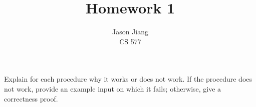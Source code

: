 \documentclass[12pt]{article}
\newenvironment{question}[2][Question]{\begin{trivlist}
\item[\hskip \labelsep {\bfseries #1}\hskip \labelsep {\bfseries #2.}]}{\end{trivlist}}
\begin{document}
 
 
\title{Homework 1}%
\author{Jason Jiang\\ %
CS 577} %
 
\maketitle
 
\begin{question}{1} 
Explain for each procedure why it works or does not work. If the procedure does not work, provide an example input on which it fails; otherwise, give a correctness proof.
\end{question}
 
\end{document}
